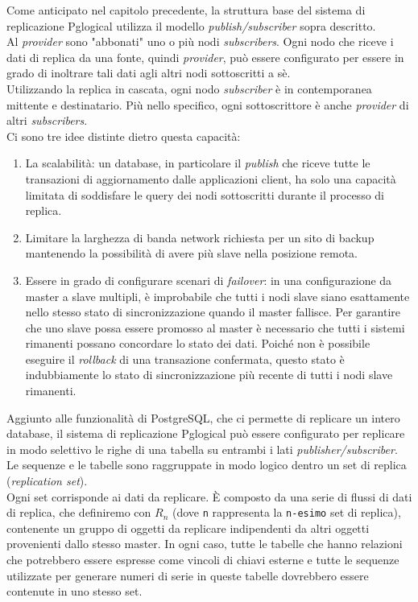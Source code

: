 Come anticipato nel capitolo precedente, la struttura base del sistema di replicazione Pglogical utilizza il modello \textit{publish/subscriber} sopra descritto.\\
Al \textit{provider} sono "abbonati" uno o pi\`{u} nodi \textit{subscribers}. Ogni nodo che riceve i dati di replica da una fonte, quindi \textit{provider}, pu\`{o} essere configurato per essere in grado di inoltrare tali dati agli altri nodi sottoscritti a s\`{e}.\\
Utilizzando la replica in cascata, ogni nodo \textit{subscriber} \`{e} in contemporanea mittente e destinatario. Pi\`{u} nello specifico, ogni sottoscrittore \`{e} anche \textit{provider} di altri \textit{subscribers}.\\ 
Ci sono tre idee distinte dietro questa capacit\`{a}:

\begin{enumerate}
\item 
La scalabilit\`{a}: un database, in particolare il \textit{publish} che riceve tutte le transazioni di aggiornamento dalle applicazioni client, ha solo una capacit\`{a} limitata di soddisfare le query dei nodi sottoscritti durante il processo di replica. 
\item
Limitare la larghezza di banda network richiesta per un sito di backup mantenendo la possibilit\`{a} di avere pi\`{u} slave nella posizione remota.
\item
Essere in grado di configurare scenari di \textit{failover}: in una configurazione da master a slave multipli, \`{e} improbabile che tutti i nodi slave siano esattamente nello stesso stato di sincronizzazione quando il master fallisce. Per garantire che uno slave possa essere promosso al master \`{e} necessario che tutti i sistemi rimanenti possano concordare lo stato dei dati. Poich\'{e} non \`{e} possibile eseguire il \textit{rollback} di una transazione confermata, questo stato \`{e} indubbiamente lo stato di sincronizzazione pi\`{u} recente di tutti i nodi slave rimanenti.\\
\end{enumerate}

Aggiunto alle funzionalit\`{a} di PostgreSQL, che ci permette di replicare un intero database, il sistema di replicazione Pglogical pu\`{o} essere configurato per replicare in modo selettivo le righe di una tabella su entrambi i lati \textit{publisher/subscriber}.\\
Le sequenze e le tabelle sono raggruppate in modo logico dentro un set di replica (\textit{replication set}). \\
Ogni set corrisponde ai dati da replicare. \`{E} composto da una serie di flussi di dati di replica, che definiremo con $R_n$ (dove \verb"n" rappresenta la \verb"n-esimo" set di replica), contenente un gruppo di oggetti da replicare indipendenti da altri oggetti provenienti dallo stesso master. In ogni caso, tutte le tabelle che hanno relazioni che potrebbero essere espresse come vincoli di chiavi esterne e tutte le sequenze utilizzate per generare numeri di serie in queste tabelle dovrebbero essere contenute in uno stesso set.

